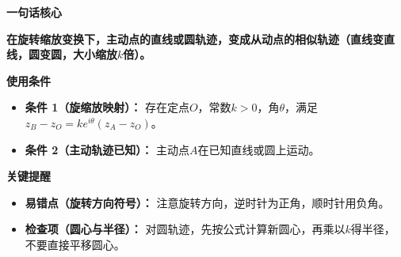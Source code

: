 \begin{summarybox}
	\textbf{\textcolor{CSummary}{一句话核心}}

	\textbf{在旋转缩放变换下，主动点的直线或圆轨迹，变成从动点的相似轨迹（直线变直线，圆变圆，大小缩放$k$倍）。}

	\medskip
	\textbf{\textcolor{CSummary}{使用条件}}
	\begin{itemize}[leftmargin=*, itemsep=0.5em, topsep=0.4em]
		\item \textbf{条件 1（旋缩放映射）：} 存在定点$O$，常数$k>0$，角$\theta$，满足$z_B - z_O = k e^{i\theta}(z_A - z_O)$。
		\item \textbf{条件 2（主动轨迹已知）：} 主动点$A$在已知直线或圆上运动。
	\end{itemize}

	\medskip
	\textbf{\textcolor{CSummary}{关键提醒}}
	\begin{itemize}[leftmargin=*, itemsep=0.5em, topsep=0.4em]
		\item \textbf{易错点（旋转方向符号）：} 注意旋转方向，逆时针为正角，顺时针用负角。
		\item \textbf{检查项（圆心与半径）：} 对圆轨迹，先按公式计算新圆心，再乘以$k$得半径，不要直接平移圆心。
	\end{itemize}
\end{summarybox}

